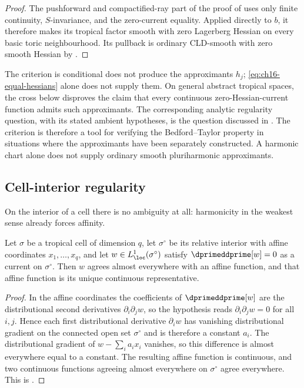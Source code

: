 \begin{proof}
The pushforward and compactified-ray part of the proof of
 uses only
finite continuity, $S$-invariance, and the zero-current equality.  Applied
directly to $b$, it therefore makes its tropical
factor smooth with zero Lagerberg Hessian on every basic toric
neighbourhood.  Its pullback is ordinary CLD-smooth with zero smooth Hessian
by \cite[Proposition~2.3.4]{BGJKK25}.
\end{proof}

\begin{warning}{The criterion is conditional}
 does not produce the approximants
$h_j$; \eqref{eq:ch16-equal-hessians} alone does not supply them.  On general abstract tropical spaces, the cross below disproves the
claim that every continuous zero-Hessian-current function admits such
approximants.  The corresponding analytic regularity question, with its
stated ambient hypotheses, is the question discussed in
.  The criterion is therefore a tool for
verifying the Bedford--Taylor property in situations where the approximants
have been separately constructed.  A harmonic chart alone does not
supply ordinary smooth pluriharmonic approximants.
\end{warning}

\subsection{Cell-interior regularity}
\label{sec:ch16-cell-interior}

On the interior of a cell there is no ambiguity at all: harmonicity in the
weakest sense already forces affinity.

\begin{proposition}
\label{prop:ch16-cell-rigidity}
Let $\sigma$ be a tropical cell of dimension $q$, let $\sigma^\circ$ be its
relative interior with affine coordinates $x_1,\ldots,x_q$, and let
$w\in L^1_{\loc}(\sigma^\circ)$ satisfy $\dprimeddprime[w]=0$ as a current
on $\sigma^\circ$.  Then $w$ agrees almost everywhere with an affine
function, and that affine function is its unique continuous representative.
\end{proposition}

\begin{proof}
In the affine coordinates the coefficients of $\dprimeddprime[w]$ are the
distributional second derivatives $\partial_i\partial_jw$, so the hypothesis
reads $\partial_i\partial_jw=0$ for all $i,j$.  Hence each first
distributional derivative $\partial_iw$ has vanishing distributional
gradient on the connected open set $\sigma^\circ$ and is therefore a
constant $a_i$.  The distributional gradient of $w-\sum_ia_ix_i$ vanishes,
so this difference is almost everywhere equal to a constant.  The resulting
affine function is continuous, and two continuous functions agreeing almost
everywhere on $\sigma^\circ$ agree everywhere.  This is
.
\end{proof}

